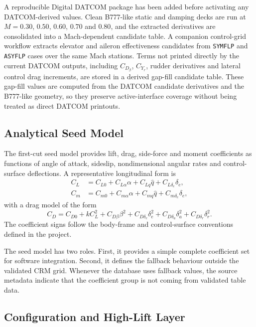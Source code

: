 A reproducible Digital DATCOM package has been added before activating any
DATCOM-derived values. Clean B777-like static and damping decks are run at
$M=0.30$, $0.50$, $0.60$, $0.70$ and $0.80$, and the extracted derivatives are
consolidated into a Mach-dependent candidate table. A companion control-grid
workflow extracts elevator and aileron effectiveness candidates from
\texttt{SYMFLP} and \texttt{ASYFLP} cases over the same Mach stations. Terms not
printed directly by the current DATCOM outputs, including $C_{D_\beta}$,
$C_{Y_r}$, rudder derivatives and lateral control drag increments, are stored
in a derived gap-fill candidate table. These gap-fill values are computed from
the DATCOM candidate derivatives and the B777-like geometry, so they preserve
active-interface coverage without being treated as direct DATCOM printouts.

\subsection{Analytical Seed Model}

The first-cut seed model provides lift, drag, side-force and moment coefficients as functions of angle of attack, sideslip, nondimensional angular rates and control-surface deflections. A representative longitudinal form is
\begin{align}
    C_L &= C_{L0} + C_{L\alpha}\alpha + C_{Lq}\hat{q} + C_{L\delta_e}\delta_e, \\
    C_m &= C_{m0} + C_{m\alpha}\alpha + C_{mq}\hat{q} + C_{m\delta_e}\delta_e,
\end{align}
with a drag model of the form
\begin{equation}
    C_D = C_{D0} + k C_L^2 + C_{D\beta}\beta^2
    + C_{D\delta_e}\delta_e^2
    + C_{D\delta_a}\delta_a^2
    + C_{D\delta_r}\delta_r^2.
\end{equation}
The coefficient signs follow the body-frame and control-surface conventions defined in the project.

The seed model has two roles. First, it provides a simple complete coefficient
set for software integration. Second, it defines the fallback behaviour outside
the validated CRM grid. Whenever the database uses fallback values, the source
metadata indicate that the coefficient group is not coming from validated table
data.

\subsection{Configuration and High-Lift Layer}

